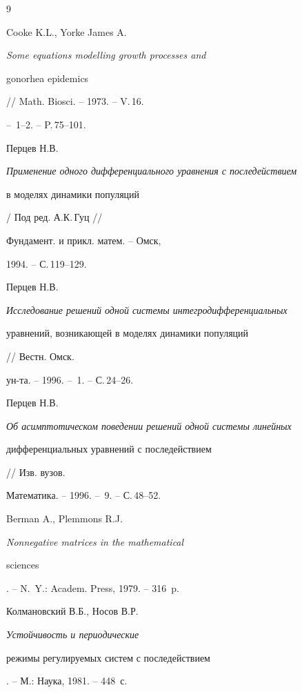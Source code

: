 \begin{thebibliography}{9} 


 




Cooke K.L., Yorke James A. {\em Some equations modelling growth processes and


gonorhea epidemics} // Math. Biosci. -- 1973. -- V.\,16.


-- \No\,1--2. -- P.\,75--101.




Перцев Н.В. {\em Применение одного дифференциального уравнения с последействием


в моделях динамики популяций} / Под ред. А.К.\,Гуц //


Фундамент. и прикл. матем. -- Омск,


1994. -- С.\,119--129.




Перцев Н.В. {\em Исследование решений одной системы интегродифференциальных


уравнений, возникающей в моделях динамики популяций} // Вестн. Омск.


ун-та. -- 1996. -- \No\,1. -- С.\,24--26.




Перцев Н.В. {\em Об асимптотическом поведении решений одной системы линейных


дифференциальных уравнений с последействием} // Изв. вузов.


Математика. -- 1996. -- \No\,9. -- С.\,48--52.




Berman A., Plemmons R.J. {\em Nonnegative matrices in the mathematical


sciences}. -- N.~Y.: Academ. Press, 1979. -- 316~p.




Колмановский В.Б., Носов В.Р. {\em Устойчивость и периодические


режимы регулируемых систем с последействием}. -- М.: Наука, 1981. -- 448~с.








\end{thebibliography} 


 


\vskip 2cm 


 






\label{end} 


 





